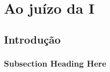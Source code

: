 \documentclass[
  12pt,
	oneside,
	a4paper,
	english,			%
	french,				%
	spanish,			%
  brazil
]{memoir}
\begin{document}
\chapter{Ao juízo da I}
\section{Introdução}
\lipsum[1-3]

\subsection{Subsection Heading Here}
\lipsum[1-2]
\end{document}

